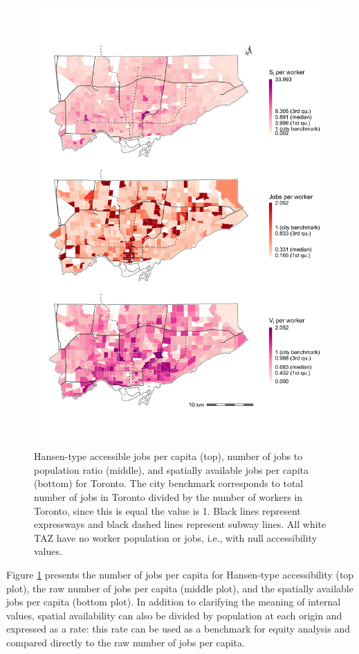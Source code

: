 \documentclass[10pt,letterpaper]{article}
\begin{document}
\begin{figure}
\includegraphics[width=1\linewidth]{images/access-job-Toronto-plot-rates} \caption{\label{fig:rate-accessibility-plot}Hansen-type accessible jobs per capita (top), number of jobs to population ratio (middle), and spatially available jobs per capita (bottom) for Toronto. The city benchmark corresponds to total number of jobs in Toronto divided by the number of workers in Toronto, since this is equal the value is 1. Black lines represent expressways and black dashed lines represent subway lines. All white TAZ have no worker population or jobs, i.e., with null accessibility values.}\label{fig:rate-accessibility-plot}
\end{figure}

Figure \ref{fig:rate-accessibility-plot} presents the number of jobs per
capita for Hansen-type accessibility (top plot), the raw number of jobs
per capita (middle plot), and the spatially available jobs per capita
(bottom plot). In addition to clarifying the meaning of internal values,
spatial availability can also be divided by population at each origin
and expressed as a rate: this rate can be used as a benchmark for equity
analysis and compared directly to the raw number of jobs per capita.
\end{document}
